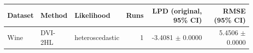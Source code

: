 \begin{tabular}{lllrrr}
\toprule
Dataset & Method & Likelihood & Runs & LPD (original, 95\% CI) & RMSE (95\% CI) \\
\midrule
Wine & DVI-2HL & heteroscedastic & 1 & -3.4081 $\pm$ 0.0000 & 5.4506 $\pm$ 0.0000 \\
\bottomrule
\end{tabular}
